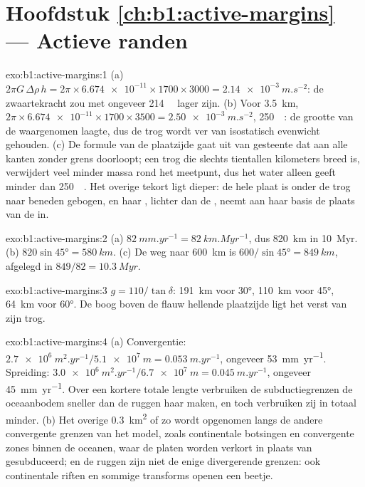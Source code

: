 \section*{Hoofdstuk \ref{ch:b1:active-margins} --- Actieve randen}

\begin{solution}{exo:b1:active-margins:1}
(a) $2\pi G\,\Delta\rho\,h = 2\pi\times\num{6.674e-11}\times1700\times3000 =
\qty{2.14e-3}{m.s^{-2}}$: de zwaartekracht zou met ongeveer
\qty{214}{\milli\gal} lager zijn. (b) Voor \qty{3.5}{km},
$2\pi\times\num{6.674e-11}\times1700\times3500 = \qty{2.50e-3}{m.s^{-2}}$,
\qty{250}{\milli\gal}: de grootte van de waargenomen laagte, dus de trog wordt ver van isostatisch evenwicht gehouden. (c) De formule van de plaatzijde gaat uit van gesteente dat aan alle kanten zonder grens doorloopt; een trog die slechts tientallen kilometers breed is, verwijdert veel minder massa rond het meetpunt, dus het water alleen geeft minder dan \qty{250}{\milli\gal}. Het overige tekort ligt dieper: de hele plaat is onder de trog naar beneden gebogen, en haar , lichter dan de , neemt aan haar basis de plaats van de  in.
\end{solution}

\begin{solution}{exo:b1:active-margins:2}
(a) $\qty{82}{mm.yr^{-1}} = \qty{82}{km.Myr^{-1}}$, dus \qty{820}{km} in
\qty{10}{Myr}. (b) $820\sin\ang{45} = \qty{580}{km}$. (c) De weg naar
\qty{600}{km} is $600/\sin\ang{45} = \qty{849}{km}$, afgelegd in
$849/82 = \qty{10.3}{Myr}$.
\end{solution}

\begin{solution}{exo:b1:active-margins:3}
$g = 110/\tan\delta$: \qty{191}{km} voor \ang{30}, \qty{110}{km} voor \ang{45},
\qty{64}{km} voor \ang{60}. De boog boven de flauw hellende plaatzijde ligt het verst van zijn trog.
\end{solution}

\begin{solution}{exo:b1:active-margins:4}
(a) Convergentie: $\qty{2.7e6}{m^2.yr^{-1}}/\qty{5.1e7}{m} =
\qty{0.053}{m.yr^{-1}}$, ongeveer \qty{53}{mm.yr^{-1}}. Spreiding:
$\qty{3.0e6}{m^2.yr^{-1}}/\qty{6.7e7}{m} = \qty{0.045}{m.yr^{-1}}$, ongeveer
\qty{45}{mm.yr^{-1}}. Over een kortere totale lengte verbruiken de subductiegrenzen de oceaanbodem sneller dan de ruggen haar maken, en toch verbruiken zij in totaal minder.
(b) Het overige \qty{0.3}{km^2} of zo wordt opgenomen langs de andere convergente grenzen van het model, zoals continentale botsingen en convergente zones binnen de oceanen, waar de platen worden verkort in plaats van gesubduceerd; en de ruggen zijn niet de enige divergerende grenzen: ook continentale riften en sommige transforms openen een beetje.
\end{solution}

